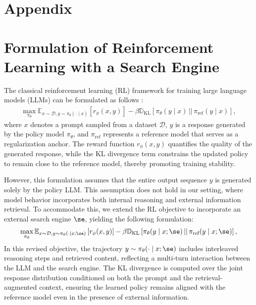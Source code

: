 \appendix

\section*{Appendix}

\section{Formulation of Reinforcement Learning with a Search Engine}\label{sec:apx:rl-formulation}

The classical reinforcement learning (RL) framework for training large language models (LLMs) can be formulated as follows \citep{rafailov2023direct,ouyang2022training}:
\begin{gather}\label{apx:eq:rl-llm}
    \max_{\pi_\theta} \mathbb{E}_{x \sim \mathcal{D}, y \sim \pi_{\theta}(\cdot \mid x)} 
\left[ r_{\phi}(x, y) \right] 
- \beta \mathbb{D}_{\text{KL}} \left[ \pi_{\theta}(y \mid x) \,||\, \pi_{\text{ref}}(y \mid x) \right],
\end{gather}
where $x$ denotes a prompt sampled from a dataset $\mathcal{D}$, $y$ is a response generated by the policy model $\pi_\theta$, and $\pi_{\text{ref}}$ represents a reference model that serves as a regularization anchor. The reward function $r_{\phi}(x, y)$ quantifies the quality of the generated response, while the KL divergence term constrains the updated policy to remain close to the reference model, thereby promoting training stability.

However, this formulation assumes that the entire output sequence $y$ is generated solely by the policy LLM. This assumption does not hold in our setting, where model behavior incorporates both internal reasoning and external information retrieval. To accommodate this, we extend the RL objective to incorporate an external search engine $\se$, yielding the following formulation:
\begin{gather}\label{apx:eq:rl-retriever}
    \max_{\pi_\theta} \mathbb{E}_{x \sim \mathcal{D}, y \sim \pi_{\theta}(\cdot \mid x; \se)} 
\left[ r_{\phi}(x, y) \right] 
- \beta \mathbb{D}_{\text{KL}} \left[ \pi_{\theta}(y \mid x; \se) \,||\, \pi_{\text{ref}}(y \mid x; \se) \right],
\end{gather}
In this revised objective, the trajectory $y \sim \pi_{\theta}(\cdot \mid x; \se)$ includes interleaved reasoning steps and retrieved content, reflecting a multi-turn interaction between the LLM and the search engine. The KL divergence is computed over the joint response distribution conditioned on both the prompt and the retrieval-augmented context, ensuring the learned policy remains aligned with the reference model even in the presence of external information.

